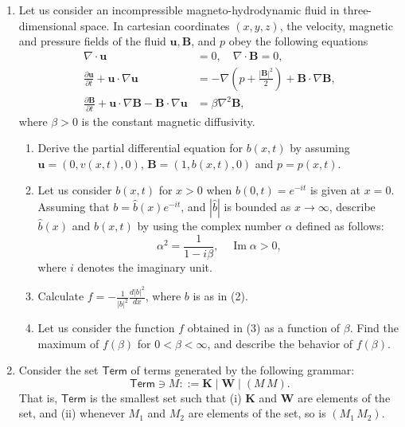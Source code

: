 \documentclass{article}
\begin{document}
\begin{enumerate}[label=\fbox{\arabic*}]
  \item Let us consider an incompressible magneto-hydrodynamic fluid in three-dimensional space. In cartesian coordinates $(x, y, z)$, the velocity, magnetic and pressure fields of the fluid $\boldsymbol{u}, \boldsymbol{B}$, and $p$ obey the following equations
        \begin{align*}
          \nabla \cdot \boldsymbol{u} &= 0, \quad \nabla \cdot \boldsymbol{B} = 0, \\
          \frac{\partial \boldsymbol{u}}{\partial t} + \boldsymbol{u} \cdot \nabla \boldsymbol{u} &= -\nabla \left( p + \frac{|\boldsymbol{B}|^2}{2} \right) + \boldsymbol{B} \cdot \nabla \boldsymbol{B}, \\
          \frac{\partial \boldsymbol{B}}{\partial t} + \boldsymbol{u} \cdot \nabla \boldsymbol{B} - \boldsymbol{B} \cdot \nabla \boldsymbol{u} &= \beta \nabla^2 \boldsymbol{B},
        \end{align*}
        where $\beta > 0$ is the constant magnetic diffusivity.
        \begin{enumerate}[label=(\arabic*)]
          \item Derive the partial differential equation for $b(x,t)$ by assuming $\boldsymbol{u} = (0, v(x,t), 0)$, $\boldsymbol{B} = (1, b(x,t), 0)$ and $p = p(x,t)$.
          \item Let us consider $b(x,t)$ for $x > 0$ when $b(0,t) = e^{-it}$ is given at $x = 0$. Assuming that $b = \hat{b}(x)e^{-it}$, and $|\hat{b}|$ is bounded as $x \to \infty$, describe $\hat{b}(x)$ and $b(x,t)$ by using the complex number $\alpha$ defined as follows:
                \[
                  \alpha^2 = \frac{1}{1 - i\beta}, \quad \operatorname{Im} \alpha > 0,
                \]
                where $i$ denotes the imaginary unit.
          \item Calculate $f = -\frac{1}{|b|^2} \frac{d|b|^2}{dx}$, where $b$ is as in (2).
          \item Let us consider the function $f$ obtained in (3) as a function of $\beta$. Find the maximum of $f(\beta)$ for $0 < \beta < \infty$, and describe the behavior of $f(\beta)$.
        \end{enumerate}

  \item Consider the set $\mathsf{Term}$ of terms generated by the following grammar:
        \[
          \mathsf{Term} \ni M ::= \mathbf{K} \mid \mathbf{W} \mid (M \, M).
        \]
        That is, $\mathsf{Term}$ is the smallest set such that
        (i) $\mathbf{K}$ and $\mathbf{W}$ are elements of the set, and
        (ii) whenever $M_1$ and $M_2$ are elements of the set, so is $(M_1 \, M_2)$.


\end{enumerate}
\end{document}

